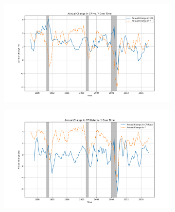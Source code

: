 \documentclass{article}
\begin{document}
\begin{figure}[H!]
\begin{subfigure}{0.45\textwidth}
  \centering
  \includegraphics[width=\linewidth]{CPI_annual_change_vs_Y.png}
\end{subfigure}%
\hspace{0.05\textwidth} %
\begin{subfigure}{0.45\textwidth}
  \centering
  \includegraphics[width=\linewidth]{CPI Rate_annual_change_vs_Y.png}
\end{subfigure}

\vspace{1em} %


\end{figure}
\end{document}
